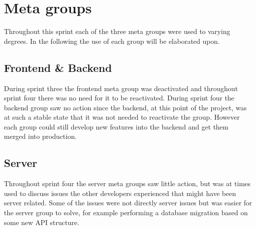 \section{Meta groups}
Throughout this sprint each of the three meta groups were used to varying degrees. 
In the following the use of each group will be elaborated upon. 
 
\subsection{Frontend \& Backend}
During sprint three the frontend meta group was deactivated and throughout sprint four there was no need for it to be reactivated. 
During sprint four the backend group saw no action since the backend, at this point of the project, was at such a stable state that it was not needed to reactivate the group.
However each group could still develop new features into the backend and get them merged into production. 

\subsection{Server}
Throughout sprint four the server meta groups saw little action, but was at times used to discuss issues the other developers experienced that might have been server related. 
Some of the issues were not directly server issues but was easier for the server group to solve, for example performing a database migration based on some new API structure.



